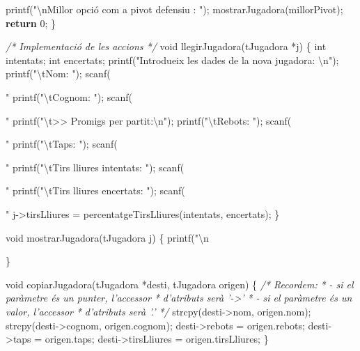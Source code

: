 \documentclass[]{book}
\newenvironment{Shaded}{\begin{snugshade}}{\end{snugshade}}
\newcommand{\DataTypeTok}[1]{\textcolor[rgb]{0.13,0.29,0.53}{#1}}
\newcommand{\DecValTok}[1]{\textcolor[rgb]{0.00,0.00,0.81}{#1}}
\newcommand{\SpecialCharTok}[1]{\textcolor[rgb]{0.00,0.00,0.00}{#1}}
\newcommand{\StringTok}[1]{\textcolor[rgb]{0.31,0.60,0.02}{#1}}
\newcommand{\CommentTok}[1]{\textcolor[rgb]{0.56,0.35,0.01}{\textit{#1}}}
\newcommand{\ControlFlowTok}[1]{\textcolor[rgb]{0.13,0.29,0.53}{\textbf{#1}}}
\newcommand{\NormalTok}[1]{#1}
\begin{document}
\begin{Shaded}
\begin{Highlighting}[]
\NormalTok{    printf(}\StringTok{"}\SpecialCharTok{\textbackslash{}n}\StringTok{Millor opció com a pivot defensiu : "}\NormalTok{);}
\NormalTok{    mostrarJugadora(millorPivot);}
    \ControlFlowTok{return} \DecValTok{0}\NormalTok{;}
\NormalTok{\}}

\CommentTok{/* Implementació de les accions */}
\DataTypeTok{void}\NormalTok{ llegirJugadora(tJugadora *j) \{}
    \DataTypeTok{int}\NormalTok{ intentats;}
    \DataTypeTok{int}\NormalTok{ encertats;}
\NormalTok{    printf(}\StringTok{"Introdueix les dades de la nova jugadora: }\SpecialCharTok{\textbackslash{}n}\StringTok{"}\NormalTok{);}
\NormalTok{    printf(}\StringTok{"}\SpecialCharTok{\textbackslash{}t}\StringTok{Nom: "}\NormalTok{);}
\NormalTok{    scanf(}\StringTok{"%
\NormalTok{    printf(}\StringTok{"}\SpecialCharTok{\textbackslash{}t}\StringTok{Cognom: "}\NormalTok{);}
\NormalTok{    scanf(}\StringTok{"%
\NormalTok{    printf(}\StringTok{"}\SpecialCharTok{\textbackslash{}t}\StringTok{>> Promigs per partit:}\SpecialCharTok{\textbackslash{}n}\StringTok{"}\NormalTok{);}
\NormalTok{    printf(}\StringTok{"}\SpecialCharTok{\textbackslash{}t}\StringTok{Rebots: "}\NormalTok{);}
\NormalTok{    scanf(}\StringTok{"%
\NormalTok{    printf(}\StringTok{"}\SpecialCharTok{\textbackslash{}t}\StringTok{Taps: "}\NormalTok{);}
\NormalTok{    scanf(}\StringTok{"%
\NormalTok{    printf(}\StringTok{"}\SpecialCharTok{\textbackslash{}t}\StringTok{Tirs lliures intentats: "}\NormalTok{);}
\NormalTok{    scanf(}\StringTok{"%
\NormalTok{    printf(}\StringTok{"}\SpecialCharTok{\textbackslash{}t}\StringTok{Tirs lliures encertats: "}\NormalTok{);}
\NormalTok{    scanf(}\StringTok{"%
\NormalTok{    j->tirsLliures = percentatgeTirsLliures(intentats, encertats);}
\NormalTok{\}}

\DataTypeTok{void}\NormalTok{ mostrarJugadora(tJugadora j) \{}
\NormalTok{    printf(}\StringTok{"}\SpecialCharTok{\textbackslash{}n}\StringTok{%
\NormalTok{\}}

\DataTypeTok{void}\NormalTok{ copiarJugadora(tJugadora *desti, tJugadora origen) \{}
    \CommentTok{/* Recordem: }
\CommentTok{     * - si el paràmetre és un punter, l'accessor }
\CommentTok{     *   d'atributs serà '->'}
\CommentTok{     * - si el paràmetre és un valor, l'accessor}
\CommentTok{     *   d'atributs serà '.'}
\CommentTok{     */}
\NormalTok{    strcpy(desti->nom, origen.nom);}
\NormalTok{    strcpy(desti->cognom, origen.cognom);}
\NormalTok{    desti->rebots = origen.rebots;}
\NormalTok{    desti->taps = origen.taps;}
\NormalTok{    desti->tirsLliures = origen.tirsLliures;}
\NormalTok{\}}

}}}}}}}
\end{Highlighting}
\end{Shaded}
\end{document}
